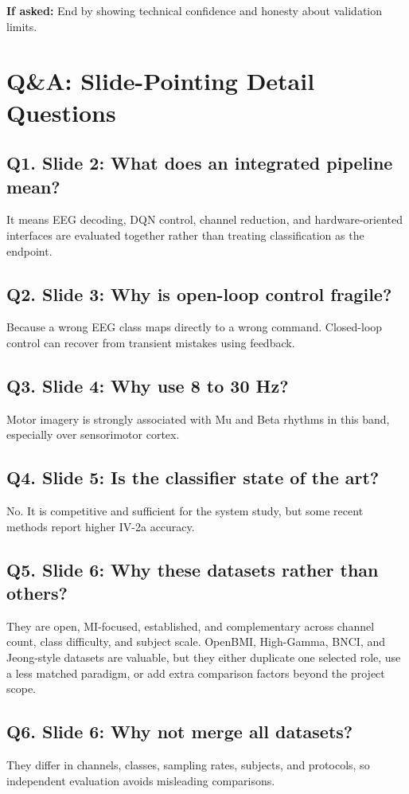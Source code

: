\documentclass[11pt]{article}
\begin{document}
\textbf{If asked:} End by showing technical confidence and honesty about validation limits.

\newpage
\section*{Q\&A: Slide-Pointing Detail Questions}
\subsection*{Q1. Slide 2: What does an integrated pipeline mean?}
It means EEG decoding, DQN control, channel reduction, and hardware-oriented interfaces are evaluated together rather than treating classification as the endpoint.


\subsection*{Q2. Slide 3: Why is open-loop control fragile?}
Because a wrong EEG class maps directly to a wrong command. Closed-loop control can recover from transient mistakes using feedback.


\subsection*{Q3. Slide 4: Why use 8 to 30 Hz?}
Motor imagery is strongly associated with Mu and Beta rhythms in this band, especially over sensorimotor cortex.


\subsection*{Q4. Slide 5: Is the classifier state of the art?}
No. It is competitive and sufficient for the system study, but some recent methods report higher IV-2a accuracy.


\subsection*{Q5. Slide 6: Why these datasets rather than others?}
They are open, MI-focused, established, and complementary across channel count, class difficulty, and subject scale. OpenBMI, High-Gamma, BNCI, and Jeong-style datasets are valuable, but they either duplicate one selected role, use a less matched paradigm, or add extra comparison factors beyond the project scope.


\subsection*{Q6. Slide 6: Why not merge all datasets?}
They differ in channels, classes, sampling rates, subjects, and protocols, so independent evaluation avoids misleading comparisons.
\end{document}
